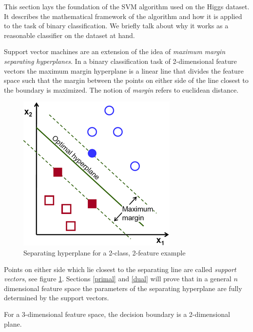 \documentclass[final,3p,times,twocolumn]{elsarticle}
\begin{document}
This section lays the foundation of the SVM algorithm used on the Higgs dataset. It describes the mathematical framework of the algorithm and how it is applied to the task of binary classification. We briefly talk about why it works as a reasonable classifier on the dataset at hand. 
 
Support vector machines are an extension of the idea of \textit{maximum margin separating hyperplanes}. In a binary classification task of 2-dimensional feature vectors the maximum margin hyperplane is a linear line that divides the feature space such that the margin between the points on either side of the line closest to the boundary is maximized. The notion of \textit{margin} refers to euclidean distance.

\begin{figure}
\includegraphics[scale=2]{Images/optimal_hyperplane_linear.png}
\caption{Separating hyperplane for a 2-class, 2-feature example}
\label{2line}
\end{figure}

Points on either side which lie closest to the  separating line are called \textit{support vectors}, see figure \ref{2line}. Sections \ref{primal} and \ref{dual} will prove that in a general $n$ dimensional feature space the parameters of the separating hyperplane are fully determined by the support vectors.

For a 3-dimensional feature space, the decision boundary is a 2-dimensional plane.  
\end{document}
